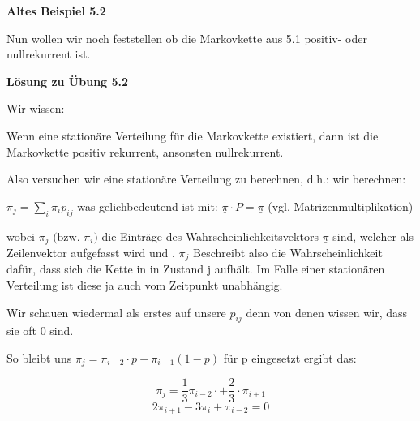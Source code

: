 \begin{uebsp}
{\centering{}\bfseries
Altes Beispiel 5.2
\par}



{
Nun wollen wir noch feststellen ob die Markovkette aus 5.1 positiv- oder
nullrekurrent ist.}
\\

\begin{center}\textbf{Lösung zu Übung 5.2}\end{center}

{
Wir wissen:}



{
Wenn eine station\"are Verteilung f\"ur die Markovkette existiert, dann
ist die Markovkette positiv rekurrent, ansonsten nullrekurrent.}



{
Also versuchen wir eine station\"are Verteilung zu berechnen, d.h.: wir
berechnen:}



{
 $\pi _{j}=\sum _{i}\pi _{i}p_{\mathit{ij}}$ was gelichbedeutend ist
mit:  $\underline{{\pi }}\cdot P=\underline{{\pi }}$ (vgl.
Matrizenmultiplikation)}



{
wobei  $\pi _{j}\text{ (bzw. }\pi _{i}\text{)}$ die Eintr\"age des
Wahrscheinlichkeitsvektors  $\underline{{\pi }}$ sind, welcher als
Zeilenvektor aufgefasst wird und .  $\pi _{j}$ Beschreibt also die
Wahrscheinlichkeit daf\"ur, dass sich die Kette in in Zustand j
aufh\"alt. Im Falle einer station\"aren Verteilung ist diese ja auch
vom Zeitpunkt unabh\"angig.}



{
Wir schauen wiedermal als erstes auf unsere  $p_{\mathit{ij}}$ denn von
denen wissen wir, dass sie oft 0 sind.}



{
So bleibt uns  $\pi _{j}=\pi _{i-2}\cdot p+\pi _{i+1}(1-p)$ f\"ur p
eingesetzt ergibt das:}



\begin{equation*}
\pi _{j}=\frac{1}{3}\pi _{i-2}\cdot +{\frac{2}{3}}\cdot \pi _{i+1}
\end{equation*}
\begin{equation*}
2\pi _{i+1}-3\pi _{i}+\pi _{i-2}=0
\end{equation*}


\end{uebsp}
